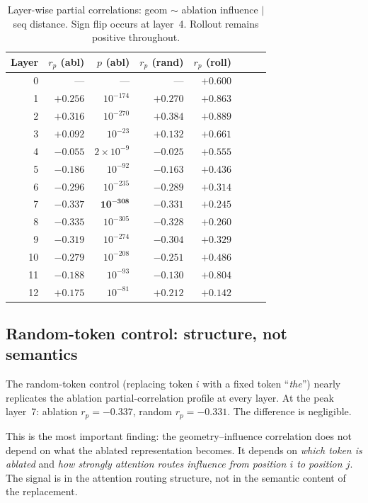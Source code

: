 \documentclass[11pt,a4paper]{article}
\begin{document}
\begin{table}[h]
\centering
\caption{Layer-wise partial correlations: geom $\sim$ ablation influence $|$ seq distance.
  Sign flip occurs at layer~4. Rollout remains positive throughout.}
\label{tab:layers}
\begin{tabular}{rrrrrrrr}
\toprule
Layer & $r_p$ (abl) & $p$ (abl) & $r_p$ (rand) & $r_p$ (roll) \\
\midrule
0  & ---          & ---              & ---       & $+0.600$ \\
1  & $+0.256$     & $10^{-174}$      & $+0.270$  & $+0.863$ \\
2  & $+0.316$     & $10^{-270}$      & $+0.384$  & $+0.889$ \\
3  & $+0.092$     & $10^{-23}$       & $+0.132$  & $+0.661$ \\
4  & $-0.055$     & $2\times10^{-9}$ & $-0.025$  & $+0.555$ \\
5  & $-0.186$     & $10^{-92}$       & $-0.163$  & $+0.436$ \\
6  & $-0.296$     & $10^{-235}$      & $-0.289$  & $+0.314$ \\
7  & $\mathbf{-0.337}$ & $\mathbf{10^{-308}}$ & $-0.331$ & $+0.245$ \\
8  & $-0.335$     & $10^{-305}$      & $-0.328$  & $+0.260$ \\
9  & $-0.319$     & $10^{-274}$      & $-0.304$  & $+0.329$ \\
10 & $-0.279$     & $10^{-208}$      & $-0.251$  & $+0.486$ \\
11 & $-0.188$     & $10^{-93}$       & $-0.130$  & $+0.804$ \\
12 & $+0.175$     & $10^{-81}$       & $+0.212$  & $+0.142$ \\
\bottomrule
\end{tabular}
\end{table}

\subsection{Random-token control: structure, not semantics}

The random-token control (replacing token $i$ with a fixed token ``\textit{the}'')
nearly replicates the ablation partial-correlation profile at every layer.
At the peak layer~7: ablation $r_p = -0.337$, random $r_p = -0.331$.
The difference is negligible.

This is the most important finding: the geometry--influence correlation
does not depend on what the ablated representation becomes.
It depends on \emph{which token is ablated} and \emph{how strongly
attention routes influence from position $i$ to position $j$}.
The signal is in the attention routing structure, not in the semantic
content of the replacement.
\end{document}
